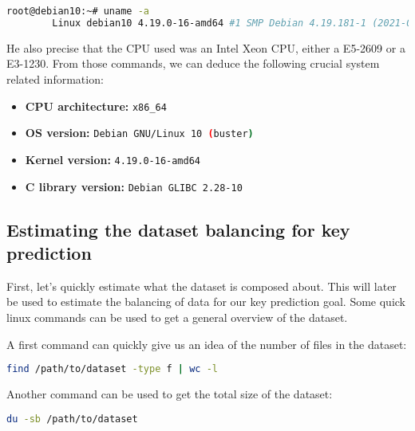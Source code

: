     \begin{minipage}{\dimexpr\linewidth-20pt}
    \begin{lstlisting}[language=bash, caption={Command and logs of the OS and kernel version used for the dataset generation}]
        root@debian10:~# uname -a
        Linux debian10 4.19.0-16-amd64 #1 SMP Debian 4.19.181-1 (2021-03-19) x86_64 GNU/Linux
    \end{lstlisting}
    \end{minipage}

    He also precise that the CPU used was an Intel Xeon CPU, either a E5-2609 or a E3-1230. From those commands, we can deduce the following crucial system related information:

    \begin{itemize}
        \item \textbf{CPU architecture:} \lstinline[language=bash]|x86_64|
        \item \textbf{OS version:} \lstinline[language=bash]|Debian GNU/Linux 10 (buster)|
        \item \textbf{Kernel version:} \lstinline[language=bash]|4.19.0-16-amd64|
        \item \textbf{C library version:} \lstinline[language=bash]|Debian GLIBC 2.28-10|
    \end{itemize}

    \subsection{Estimating the dataset balancing for key prediction}
    First, let's quickly estimate what the dataset is composed about. This will later be used to estimate the balancing of data for our key prediction goal. Some quick linux commands can be used to get a general overview of the dataset.
    
    A first command can quickly give us an idea of the number of files in the dataset:
    \begin{lstlisting}[caption={Count all dataset files}, label=methods:code:count_all_dataset_files, language=bash]
        find /path/to/dataset -type f | wc -l
    \end{lstlisting}

    Another command can be used to get the total size of the dataset:
    \begin{lstlisting}[caption={Get the total size of the dataset}, label=methods:code:get_total_size_dataset, language=bash]
        du -sb /path/to/dataset
    \end{lstlisting}

